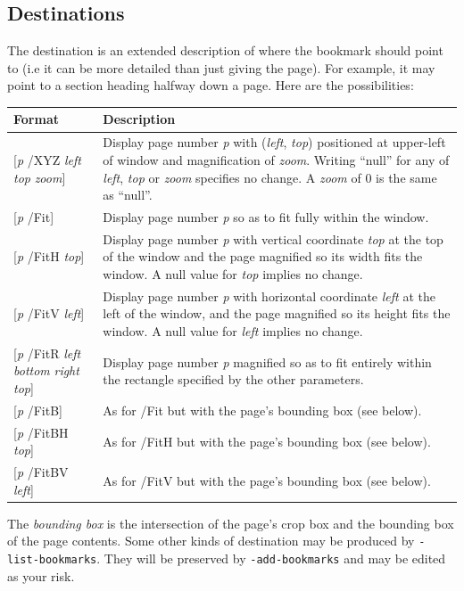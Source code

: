 \documentclass{book}
\begin{document}
\subsection{Destinations}

\label{destinations}
The destination is an extended description of where the bookmark should point to (i.e it can be more detailed than just giving the page). For example, it may point to a section heading halfway down a page. Here are the possibilities:

\medskip

\begin{tabular}{lp{8cm}}
Format & Description\\\hline
{[\textit{p} /XYZ \textit{left} \textit{top} \textit{zoom}]} & Display page number \textit{p} with (\textit{left}, \textit{top}) positioned at upper-left of window and magnification of \textit{zoom}. Writing ``null'' for any of \textit{left}, \textit{top} or \textit{zoom} specifies no change. A \textit{zoom} of 0 is the same as ``null''.\\
{[\textit{p} /Fit]} & Display page number \textit{p} so as to fit fully within the window.\\
{[\textit{p} /FitH \textit{top}]} & Display page number \textit{p} with vertical coordinate \textit{top} at the top of the window and the page magnified so its width fits the window. A null value for \textit{top} implies no change.\\
{[\textit{p} /FitV \textit{left}]} & Display page number \textit{p} with horizontal coordinate \textit{left} at the left of the window, and the page magnified so its height fits the window. A null value for \textit{left} implies no change. \\
{[\textit{p} /FitR \textit{left} \textit{bottom} \textit{right} \textit{top}]} & Display page number \textit{p} magnified so as to fit entirely within the rectangle specified by the other parameters. \\
{[\textit{p} /FitB]} & As for /Fit but with the page's bounding box (see below).\\
{[\textit{p} /FitBH \textit{top}]} & As for /FitH but with the page's bounding box (see below).\\
{[\textit{p} /FitBV \textit{left}]} & As for /FitV but with the page's bounding box (see below).
\end{tabular}

\medskip

\noindent The \textit{bounding box} is the intersection of the page's crop box and the bounding box of the page contents. Some other kinds of destination may be produced by \texttt{-list-bookmarks}. They will be preserved by \texttt{-add-bookmarks} and may be edited as your risk.
\end{document}
